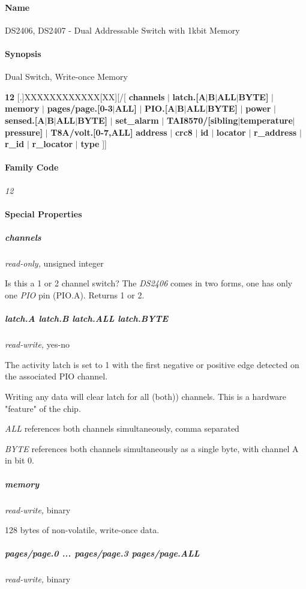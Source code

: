 \paragraph*{Name}
DS2406, DS2407 - Dual Addressable Switch with 1kbit Memory

\paragraph*{Synopsis}
Dual Switch, Write-once Memory 

\textbf{12} [.]XXXXXXXXXXXX[XX][/[ \textbf{channels}
$|$ \textbf{latch.[A$|$B$|$ALL$|$BYTE]} $|$ \textbf{memory} $|$ \textbf{pages/page.[0-3$|$ALL]} $|$ \textbf{PIO.[A$|$B$|$ALL$|$BYTE]} $|$ \textbf{power} $|$ \textbf{sensed.[A$|$B$|$ALL$|$BYTE]}
$|$ \textbf{set\_alarm} $|$ \textbf{TAI8570/[sibling$|$temperature$|$pressure]} $|$ \textbf{T8A/volt.[0-7,ALL]}    
      \textbf{address} $|$ \textbf{crc8} $|$ \textbf{id} $|$ \textbf{locator} $|$ \textbf{r\_address} $|$ \textbf{r\_id} $|$ \textbf{r\_locator} $|$ \textbf{type}  ]]

\paragraph*{Family Code}


\textit{12} 
\paragraph*{Special Properties}

\subparagraph*{channels}\textit{read-only,} unsigned integer 

Is this a 1 or 2 channel switch? The \textit{DS2406} comes in two forms, one has
only one \textit{PIO} pin (PIO.A). Returns 1 or 2. 
\subparagraph*{latch.A latch.B latch.ALL latch.BYTE}\textit{read-write,}
yes-no 

The activity latch is set to 1 with the first negative or positive edge
detected on the associated PIO channel. 

Writing any data will clear latch for all (both)) channels. This is a hardware
"feature" of the chip. 

\textit{ALL} references both channels simultaneously, comma separated 

\textit{BYTE} references both channels simultaneously as a single byte, with channel
A in bit 0. 
\subparagraph*{memory}\textit{read-write,} binary 

128 bytes of non-volatile, write-once data. 
\subparagraph*{pages/page.0 ... pages/page.3 pages/page.ALL}\textit{read-write,}
binary 

